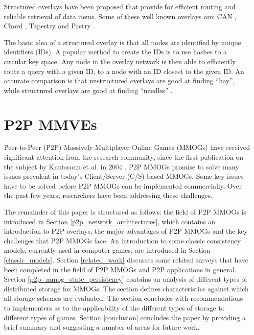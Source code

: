 Structured overlays have been proposed that provide for efficient routing and reliable retrieval of data items. Some of these well known overlays
are: CAN \cite{CAN}, Chord \cite{chord}, Tapestry \cite{tapestry} and Pastry \cite{pastry}.

The basic idea of a structured overlay is that all nodes are identified by unique identifiers (IDs). A popular method to create the IDs is to use
hashes to a circular key space. Any node in the overlay network is then able to efficiently route a query with a given ID, to a node with an ID
closest to the given ID. An accurate comparison is that unstructured overlays are good at finding ``hay'', while structured overlays are good at
finding ``needles'' \cite{Rodrigues_acm_comms_p2p}.


\section{P2P MMVEs}
\label{background}

Peer-to-Peer (P2P) Massively Multiplayer Online Games (MMOGs) have received significant attention from the research community, since
the first publication on the subject by Knutssonn et al. in 2004 \cite{knutsson_p2p_first}. P2P MMOGs promise to solve many issues prevalent in
today's Client/Server (C/S) based MMOGs. Some key issues have to be solved before P2P MMOGs can be implemented commercially. Over the past few years,
researchers have been addressing these challenges.

The remainder of this paper is structured as follows:
%
the field of P2P MMOGs is introduced in Section  \ref{p2p_network_architectures}, which contains an introduction to P2P overlays, the major advantages of P2P MMOGs and the key challenges that P2P MMOGs face.
%
An introduction to some classic consistency models, currently used in computer games, are introduced in Section \ref{classic_models}.
%
Section \ref{related_work} discusses some related surveys that have been completed in the field of P2P MMOGs and P2P applications in general.
%
Section \ref{p2p_mmog_state_persistency} contains an analysis of different types of distributed storage for MMOGs. The section defines characteristics against which all storage schemes are evaluated. The section concludes with recommendations to implementers as to the applicability of the different types of storage to different types of games.
%
Section \ref{conclusion} concludes the paper by providing a brief summary and suggesting a number of areas for future work.

